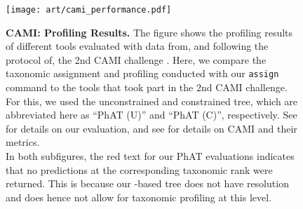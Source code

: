 
\begin{figure}[hpbt]
    \centering
    \texttt{[image: art/cami\_performance.pdf]}
    \begin{subfigure}{0pt}
        \label{fig:cami_performance:sub:relative}
    \end{subfigure}
    \begin{subfigure}{0pt}
        \label{fig:cami_performance:sub:absolute}
    \end{subfigure}
    \caption[CAMI: Profiling Results]{
        \textbf{CAMI: Profiling Results.}
        The figure shows the profiling results of different tools evaluated with data from, and following the protocol of,
        the 2nd CAMI challenge \citep{Sczyrba2017,Bremges2018}.
        Here, we compare the taxonomic assignment and profiling conducted with our \texttt{assign} command
        to the tools that took part in the 2nd CAMI challenge.
        For this, we used the unconstrained and constrained  tree,
        which are abbreviated here as ``PhAT (U)'' and ``PhAT (C)'', respectively.
        See  for details on our evaluation,
        and see \cite{Sczyrba2017} for details on CAMI and their metrics.
        \\
        In both subfigures, the red text for our PhAT evaluations indicates
        that no predictions at the corresponding taxonomic rank were returned.
        This is because our -based tree does not have  resolution
        and does hence not allow for taxonomic profiling at this level.
    }
    \label{fig:cami_performance}
\end{figure}

